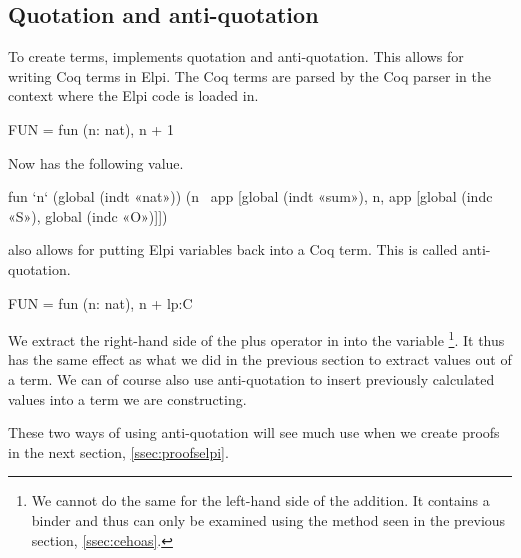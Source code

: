 \documentclass[thesis.tex]{subfiles}
\begin{document}
{{{{\subsection{Quotation and anti-quotation}\label{ssec:ceqoute}
To create terms, \ce implements quotation and anti-quotation. This allows for writing Coq terms in Elpi. The Coq terms are parsed by the Coq parser in the context where the Elpi code is loaded in.
\begin{elpicode}
  FUN = {{ fun (n: nat), n + 1 }}
\end{elpicode}
Now  has the following value.
\begin{elpicode}
  fun `n` (global (indt «nat»)) 
            (n \ app [global (indt «sum»), 
                      n, app [global (indc «S»), 
                              global (indc «O»)]])
\end{elpicode}
\ce also allows for putting Elpi variables back into a Coq term. This is called anti-quotation.
\begin{elpicode}
  FUN = {{ fun (n: nat), n + lp:C }}
\end{elpicode}
We extract the right-hand side of the plus operator in  into the variable \footnote{We cannot do the same for the left-hand side of the addition. It contains a binder and thus can only be examined using the method seen in the previous section, \cref{ssec:cehoas}.}. It thus has the same effect as what we did in the previous section to extract values out of a term. We can of course also use anti-quotation to insert previously calculated values into a term we are constructing.

These two ways of using anti-quotation will see much use when we create proofs in the next section, \cref{ssec:proofselpi}.

}}}}
\end{document}
